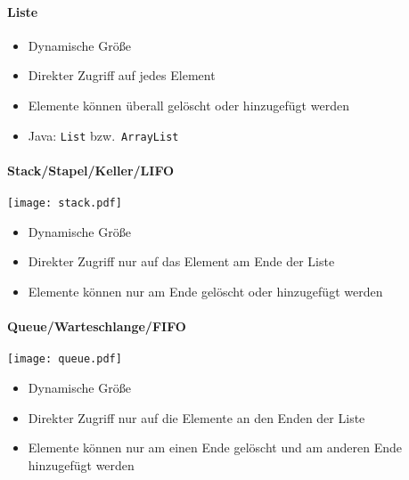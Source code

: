 \paragraph{Liste}
\begin{itemize}
  \item Dynamische Größe
  \item Direkter Zugriff auf jedes Element
  \item Elemente können überall gelöscht oder hinzugefügt werden
  \item Java: \texttt{List} bzw.~\texttt{ArrayList}
\end{itemize}

\paragraph{Stack/Stapel/Keller/LIFO}
\noindent\begin{center}
    \texttt{[image: stack.pdf]}
\end{center}
\begin{itemize}
  \item Dynamische Größe
  \item Direkter Zugriff nur auf das Element am Ende der Liste
  \item Elemente können nur am Ende gelöscht oder hinzugefügt werden
\end{itemize}

\paragraph{Queue/Warteschlange/FIFO}
\noindent\begin{center}
    \texttt{[image: queue.pdf]}
\end{center}
\begin{itemize}
  \item Dynamische Größe
  \item Direkter Zugriff nur auf die Elemente an den Enden der Liste
  \item Elemente können nur am einen Ende gelöscht und am anderen Ende hinzugefügt werden
\end{itemize}

